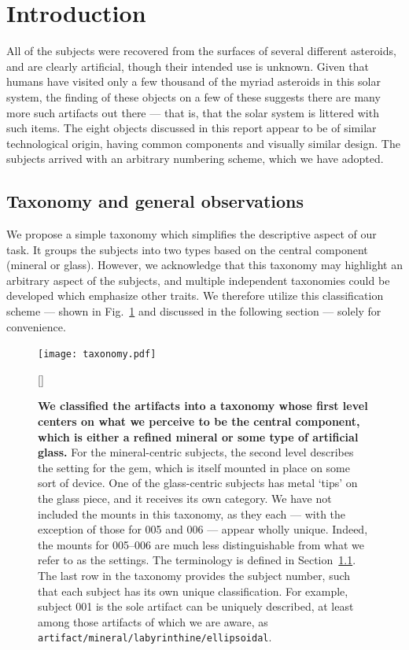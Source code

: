 \documentclass[10pt,twoside,openany]{article}
\theoremstyle{definition}
\begin{document}
\section{Introduction}
All of the subjects were recovered from the surfaces of several different asteroids, and are clearly artificial, though their intended use is unknown.
Given that humans have visited only a few thousand of the myriad asteroids in this solar system, the finding of these objects on a few of these suggests there are many more such artifacts out there --- that is, that the solar system is littered with such items.
The eight objects discussed in this report appear to be of similar technological origin, having common components and visually similar design.
The subjects arrived with an arbitrary numbering scheme, which we have adopted.

\subsection{Taxonomy and general observations}\label{sec:taxonomy}
We propose a simple taxonomy which simplifies the descriptive aspect of our task.
It groups the subjects into two types based on the central component (mineral or glass).
However, we acknowledge that this taxonomy may highlight an arbitrary aspect of the subjects, and multiple independent taxonomies could be developed which emphasize other traits.
We therefore utilize this classification scheme --- shown in Fig.~\ref{fig:taxonomy} and discussed in the following section --- solely for convenience.

\begin{figure}[p]
  \begin{leftfullpage}
    \texttt{[image: taxonomy.pdf]}
  \end{leftfullpage}
\end{figure}
\begin{figure}[p]
  \begin{fullpage}
  [\FBwidth]
{\caption{\label{fig:taxonomy}\textbf{We classified the artifacts into a taxonomy whose first level centers on what we perceive to be the central component, which is either a refined mineral or some type of artificial glass.} For the mineral-centric subjects, the second level describes the setting for the gem, which is itself mounted in place on some sort of device. One of the glass-centric subjects has metal `tips' on the glass piece, and it receives its own category. We have not included the mounts in this taxonomy, as they each --- with the exception of those for 005 and 006 --- appear wholly unique. Indeed, the mounts for 005--006 are much less distinguishable from what we refer to as the settings. The terminology is defined in Section~\ref{sec:taxonomy}. The last row in the taxonomy provides the subject number, such that each subject has its own unique classification. For example, subject 001 is the sole artifact can be uniquely described, at least among those artifacts of which we are aware, as \texttt{artifact/mineral/labyrinthine/ellipsoidal}.}}
{}
  \end{fullpage}
\end{figure}
\end{document}
